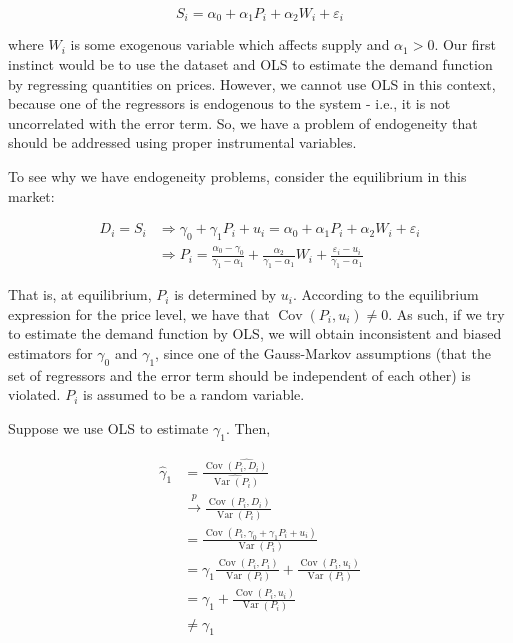 $$
S_{i}=\alpha_{0}+\alpha_{1} P_{i}+\alpha_{2} W_{i}+\varepsilon_{i}
$$

where $W_{i}$ is some exogenous variable which affects supply and $\alpha_{1}>0$. Our first instinct would be to use the dataset and OLS to estimate the demand function by regressing quantities on prices. However, we cannot use OLS in this context, because one of the regressors is endogenous to the system - i.e., it is not uncorrelated with the error term. So, we have a problem of endogeneity that should be addressed using proper instrumental variables.

To see why we have endogeneity problems, consider the equilibrium in this market:

$$
\begin{aligned}
D_{i}=S_{i} & \Longrightarrow \gamma_{0}+\gamma_{1} P_{i}+u_{i}=\alpha_{0}+\alpha_{1} P_{i}+\alpha_{2} W_{i}+\varepsilon_{i} \\
& \Longrightarrow P_{i}=\frac{\alpha_{0}-\gamma_{0}}{\gamma_{1}-\alpha_{1}}+\frac{\alpha_{2}}{\gamma_{1}-\alpha_{1}} W_{i}+\frac{\varepsilon_{i}-u_{i}}{\gamma_{1}-\alpha_{1}}
\end{aligned}
$$

That is, at equilibrium, $P_{i}$ is determined by $u_{i}$. According to the equilibrium expression for the price level, we have that $\operatorname{Cov}\left(P_{i}, u_{i}\right) \neq 0$. As such, if we try to estimate the demand function by OLS, we will obtain inconsistent and biased estimators for $\gamma_{0}$ and $\gamma_{1}$, since one of the Gauss-Markov assumptions (that the set of regressors and the error term should be independent of each other) is violated. $P_{i}$ is assumed to be a random variable.

Suppose we use OLS to estimate $\gamma_{1}$. Then,

$$
\begin{aligned}
\widehat{\gamma}_{1} & =\frac{\operatorname{Cov} \widehat{\left(P_{i}, D_{i}\right)}}{\widehat{\operatorname{Var}\left(P_{i}\right)}} \\
& \xrightarrow{p} \frac{\operatorname{Cov}\left(P_{i}, D_{i}\right)}{\operatorname{Var}\left(P_{i}\right)} \\
& =\frac{\operatorname{Cov}\left(P_{i}, \gamma_{0}+\gamma_{1} P_{i}+u_{i}\right)}{\operatorname{Var}\left(P_{i}\right)} \\
& =\gamma_{1} \frac{\operatorname{Cov}\left(P_{i}, P_{i}\right)}{\operatorname{Var}\left(P_{i}\right)}+\frac{\operatorname{Cov}\left(P_{i}, u_{i}\right)}{\operatorname{Var}\left(P_{i}\right)} \\
& =\gamma_{1}+\frac{\operatorname{Cov}\left(P_{i}, u_{i}\right)}{\operatorname{Var}\left(P_{i}\right)} \\
& \neq \gamma_{1}
\end{aligned}
$$

